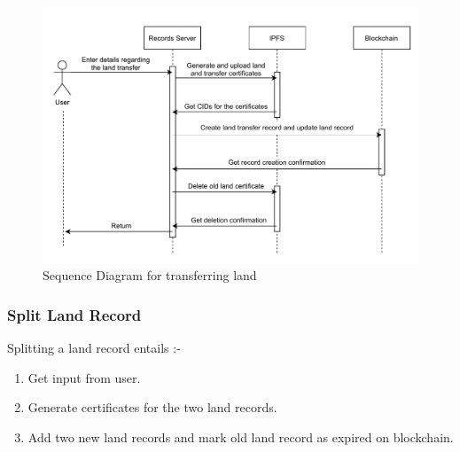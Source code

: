 \documentclass{article}
\begin{document}
            \begin{figure}[htbp]
                \includegraphics[scale=0.25]{records_seq_transfer}
                \centering
                \caption{Sequence Diagram for transferring land}
            \end{figure}
        \subsubsection{Split Land Record}
            Splitting a land record entails :-
            \begin{enumerate}
                \item Get input from user.
                \item Generate certificates for the two land records.
                \item Add two new land records and mark old land record as expired on blockchain.
            \end{enumerate}
            
\end{document}
